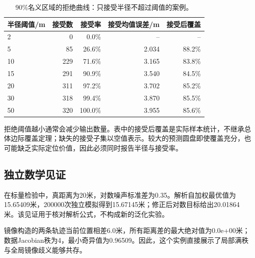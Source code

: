 \begin{table}[H]\centering\small
\caption{90\%名义区域的拒绝曲线：只接受半径不超过阈值的案例。}

\begin{tabular}{lrrrr}
\toprule
半径阈值/m & 接受数 & 接受率 & 接受均值误差/m & 接受后覆盖\\
\midrule
2 & 0 & 0.0\% & -- & --\\
5 & 85 & 26.6\% & 2.034 & 88.2\%\\
10 & 229 & 71.6\% & 3.165 & 83.8\%\\
15 & 291 & 90.9\% & 3.540 & 84.5\%\\
20 & 311 & 97.2\% & 3.702 & 85.2\%\\
30 & 318 & 99.4\% & 3.870 & 85.5\%\\
50 & 320 & 100.0\% & 3.955 & 85.6\%\\
\bottomrule\end{tabular}\end{table}

拒绝阈值越小通常会减少输出数量。表中的接受后覆盖是实际样本统计，不继承总体边际覆盖定理；缺失的接受子集以空值表示。较大的预测圆盘即使覆盖充分，也可能缺乏实际定位价值，因此必须同时报告半径与接受率。

\subsection{独立数学见证}

在标量检验中，真距离为20米，对数噪声标准差为0.35。解析自加权最优值为15.65409米，200000次独立模拟得到15.67145米；修正后对数目标给出20.01864米。该见证用于核对解析公式，不构成新的泛化实验。

镜像构造的两条轨迹当前位置相差6.0米，所有距离差的最大绝对值为0.0e+00米；数据Jacobian秩为4，最小奇异值为0.96509。因此，这个实例直接展示了局部满秩与全局镜像歧义能够共存。



